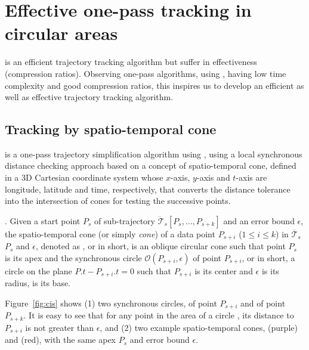 \section{Effective one-pass tracking in circular areas}
\label{sec:circular}

\ldrh is an efficient trajectory tracking algorithm but suffer in effectiveness (compression ratios).
Observing one-pass algorithms, \cised using \sed, having low time complexity and good compression ratios, this inspires us to develop an efficient as well as effective trajectory tracking algorithm.

\subsection{Tracking by spatio-temporal cone}
\cised \cite{Lin:Cised} is a one-pass trajectory simplification algorithm using \sed, using a local synchronous distance checking approach based on a concept of spatio-temporal cone, defined in a 3D Cartesian coordinate system whose $x$-axis, $y$-axis and $t$-axis are longitude, latitude and time, respectively, that converts the \sed distance tolerance into the intersection of cones for testing the successive points.




. 
Given a start point $P_s$ of sub-trajectory $\dddot{\mathcal{T}}_s[P_s, \ldots, P_{s+k}]$ and an error bound $\epsilon$, the spatio-temporal cone (or simply \textit{cone}) of a data point $P_{s+i}$ ($1\le i\le k$) in $\dddot{\mathcal{T}_s}$ \wrt $P_s$ and $\epsilon$, denoted as , or  in short, is an oblique circular cone such that point $P_s$ is its apex and the synchronous circle $\mathcal{O}(P_{s+i}, \epsilon)$ of point $P_{s+i}$, or  in short, a circle on the plane $P.t-P_{s+i}.t = 0$ such that $P_{s+i}$ is its center and $\epsilon$ is its radius, is its base.


\begin{example}
	\label{exm-circles-cones}
	Figure~\ref{fig:cis} shows 
	(1) two synchronous circles,  of point $P_{s+i}$ and  of point $P_{s+k}$.
	It is easy to see that for any point in the area of a circle , its distance to $P_{s+i}$ is not greater than $\epsilon$, 
	and (2) two example spatio-temporal cones,  {(purple)} and  (red), with the same apex $P_s$ and error bound $\epsilon$. %
\end{example}

